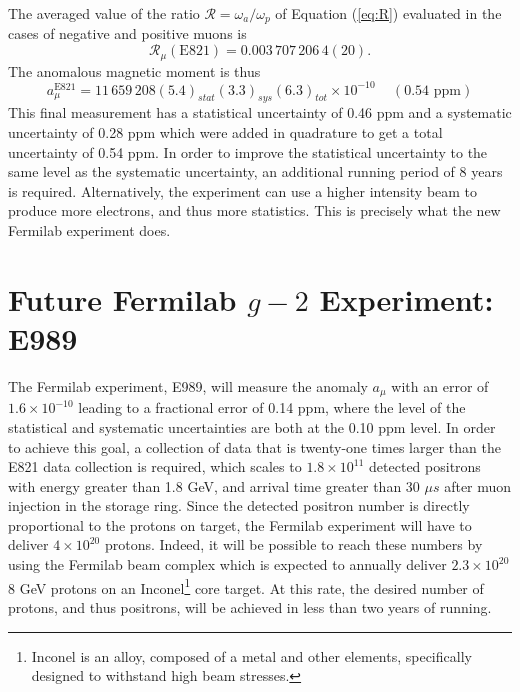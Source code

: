 \documentclass{outhesis}
\begin{document}
The averaged value of the ratio $\mathcal{R} = \omega_a/\omega_p$ of Equation (\ref{eq:R}) evaluated in the cases of negative and positive muons is
\begin{equation}
\mathcal{R}_{\mu}\left(\text{E821}\right) = 0.003\,707\,206\,4(20).
\end{equation}
The anomalous magnetic moment is thus 
\begin{equation}
a_{\mu}^{\text{E821}} = 11\, 659\, 208  \left(5.4\right)_{stat}  \left(3.3\right)_{sys}  \left(6.3\right)_{tot} \times 10^{-10} \,\,\,\,\,\,\, \left(0.54  \text{ ppm}\right)
\end{equation}
This final measurement has a statistical uncertainty of 0.46 ppm and a systematic uncertainty of 0.28 ppm which were added in quadrature to get a total uncertainty of 0.54 ppm. In order to improve the statistical uncertainty to the same level as the systematic uncertainty, an additional running period of 8 years is required. Alternatively, the experiment can use a higher intensity beam to produce more electrons, and thus more statistics. This is precisely what the new Fermilab experiment does.

\section{Future Fermilab $g-2$ Experiment: E989}

The Fermilab experiment, E989, will measure the anomaly $a_{\mu}$ with an error of $1.6 \times 10^{-10}$ leading to a fractional error of 0.14 ppm, where the level of the statistical and systematic uncertainties are both at the 0.10 ppm level. In order to achieve this goal, a collection of data that is twenty-one times larger than the E821 data collection is required, which scales to $1.8\times10^{11}$ detected positrons with energy greater than 1.8 GeV, and arrival time greater than 30 $\mu s$ after muon injection in the storage ring. Since the detected positron number is directly proportional to the protons on target, the Fermilab experiment will have to deliver $4\times10^{20}$ protons. Indeed, it will be possible to reach these numbers by using the Fermilab beam complex which is expected to annually deliver $2.3 \times 10^{20}$ 8 GeV protons on an Inconel\footnote{Inconel is an alloy, composed of a metal and other elements, specifically designed to withstand high beam stresses.} core target. At this rate, the desired number of protons, and thus positrons, will be achieved in less than two years of running. 
\end{document}
